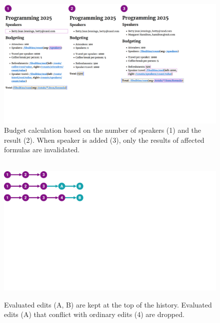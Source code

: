 \documentclass[sigconf,anonymous,screen]{acmart}
\begin{document}

\begin{figure}[t]
  \includegraphics[width=1\columnwidth,clip,trim=0.1cm 5cm 5.1cm 0cm]{fig/incremental.pdf}
  \vspace{-1em}
  \caption{Budget calculation based on the number of speakers (1) and the result (2). When speaker
  is added (3), only the results of affected formulas are invalidated.}
  \label{fig:incremental}
  \vspace{-1em}
\end{figure}



\begin{figure}[t]
\centering
\vspace{-0.5em}
\begin{minipage}{0.55\columnwidth}
  ~\\[1em]
  \includegraphics[width=0.9\columnwidth,clip,trim=0cm 14cm 21cm 0cm]{fig/eval.pdf}
  \end{minipage}%
  \begin{minipage}{0.45\columnwidth}
    \caption{Evaluated edits (A, B) are kept at the top of the history. Evaluated edits (A)
      that conflict with ordinary edits (4) are dropped.}
    \label{fig:eval}
  \end{minipage}
  \vspace{-1em}
\end{figure}
\end{document}
